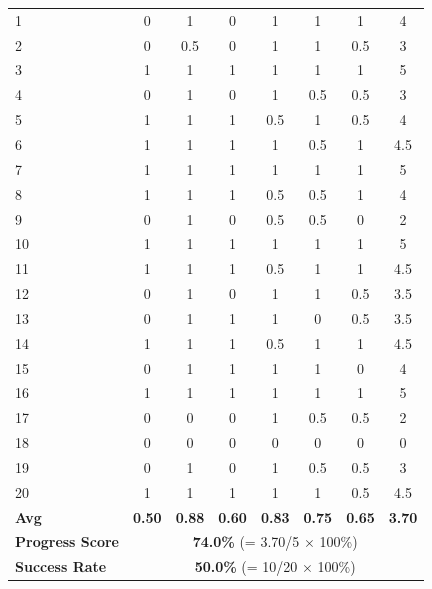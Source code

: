 \documentclass[onecolumn]{robbyant}           %
\begin{document}
\begin{table}[t]
\begin{tabular}{l|c|ccccc|c}
\midrule
1  & 0 & 1 & 0 & 1 & 1 & 1 & 4 \\
2  & 0 & 0.5 & 0 & 1 & 1 & 0.5 & 3 \\
3  & 1 & 1 & 1 & 1 & 1 & 1 & 5 \\
4  & 0 & 1 & 0 & 1 & 0.5 & 0.5 & 3 \\
5  & 1 & 1 & 1 & 0.5 & 1 & 0.5 & 4 \\
6  & 1 & 1 & 1 & 1 & 0.5 & 1 & 4.5 \\
7  & 1 & 1 & 1 & 1 & 1 & 1 & 5 \\
8  & 1 & 1 & 1 & 0.5 & 0.5 & 1 & 4 \\
9  & 0 & 1 & 0 & 0.5 & 0.5 & 0 & 2 \\
10 & 1 & 1 & 1 & 1 & 1 & 1 & 5 \\
11 & 1 & 1 & 1 & 0.5 & 1 & 1 & 4.5 \\
12 & 0 & 1 & 0 & 1 & 1 & 0.5 & 3.5 \\
13 & 0 & 1 & 1 & 1 & 0 & 0.5 & 3.5 \\
14 & 1 & 1 & 1 & 0.5 & 1 & 1 & 4.5 \\
15 & 0 & 1 & 1 & 1 & 1 & 0 & 4 \\
16 & 1 & 1 & 1 & 1 & 1 & 1 & 5 \\
17 & 0 & 0 & 0 & 1 & 0.5 & 0.5 & 2 \\
18 & 0 & 0 & 0 & 0 & 0 & 0 & 0 \\
19 & 0 & 1 & 0 & 1 & 0.5 & 0.5 & 3 \\
20 & 1 & 1 & 1 & 1 & 1 & 0.5 & 4.5 \\
\midrule
\textbf{Avg} & \textbf{0.50} & \textbf{0.88} & \textbf{0.60} & \textbf{0.83} & \textbf{0.75} & \textbf{0.65} & \textbf{3.70} \\
\textbf{Progress Score} & \multicolumn{7}{c}{\textbf{74.0\%} (= 3.70/5 $\times$ 100\%)} \\
\textbf{Success Rate} & \multicolumn{7}{c}{\textbf{50.0\%} (= 10/20 $\times$ 100\%)} \\
\bottomrule
\end{tabular}
\end{table}
\end{document}
